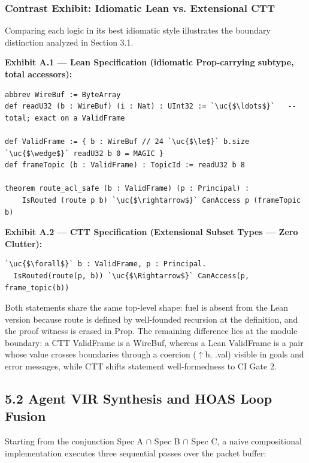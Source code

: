 

\subsubsection*{Contrast Exhibit: Idiomatic Lean vs. Extensional CTT}
Comparing each logic in its best idiomatic style illustrates the boundary distinction analyzed in Section 3.1.


\par\medskip\noindent\textbf{Exhibit A.1 --- Lean Specification (idiomatic Prop-carrying subtype, total accessors):}\par\nopagebreak
\begin{lstlisting}
abbrev WireBuf := ByteArray
def readU32 (b : WireBuf) (i : Nat) : UInt32 := `\uc{$\ldots$}`   -- total; exact on a ValidFrame

def ValidFrame := { b : WireBuf // 24 `\uc{$\le$}` b.size `\uc{$\wedge$}` readU32 b 0 = MAGIC }
def frameTopic (b : ValidFrame) : TopicId := readU32 b 8

theorem route_acl_safe (b : ValidFrame) (p : Principal) :
    IsRouted (route p b) `\uc{$\rightarrow$}` CanAccess p (frameTopic b)
\end{lstlisting}

\par\medskip\noindent\textbf{Exhibit A.2 --- CTT Specification (Extensional Subset Types --- Zero Clutter):}\par\nopagebreak
\begin{lstlisting}
`\uc{$\forall$}` b : ValidFrame, p : Principal.
  IsRouted(route(p, b)) `\uc{$\Rightarrow$}` CanAccess(p, frame_topic(b))
\end{lstlisting}
Both statements share the same top-level shape: fuel is absent from the Lean version because route is defined by well-founded recursion at the definition, and the proof witness is erased in Prop. The remaining difference lies at the module boundary: a CTT ValidFrame is a WireBuf, whereas a Lean ValidFrame is a pair whose value crosses boundaries through a coercion (\ensuremath{\uparrow}b, .val) visible in goals and error messages, while CTT shifts statement well-formedness to CI Gate 2.


\subsection*{5.2 Agent VIR Synthesis and HOAS Loop Fusion}
Starting from the conjunction Spec A \ensuremath{\cap} Spec B \ensuremath{\cap} Spec C, a naive compositional implementation executes three sequential passes over the packet buffer:


